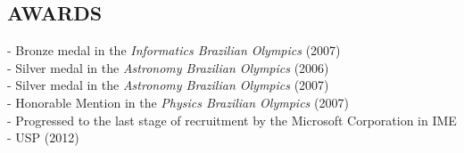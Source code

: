 \documentclass[]{res} %
\def \divspace{6pt}
\begin{document}
\begin{resume}

\section{AWARDS \hspace{\divspace} }

- Bronze medal in the {\sl Informatics Brazilian Olympics} (2007) \\
- Silver medal in the {\sl Astronomy Brazilian Olympics} (2006) \\
- Silver medal in the {\sl Astronomy Brazilian Olympics} (2007) \\
- Honorable Mention in the {\sl Physics Brazilian Olympics} (2007) \\
- Progressed to the last stage of recruitment by the Microsoft Corporation in IME - USP (2012)


\end{resume}
\end{document}
